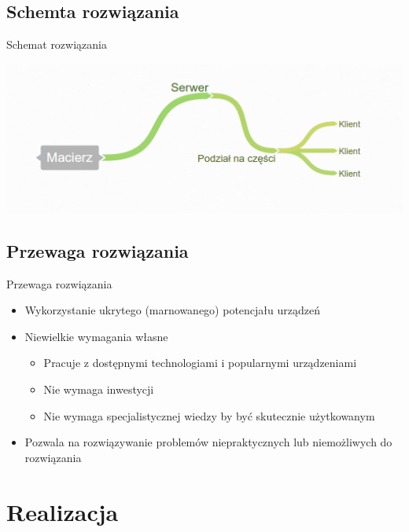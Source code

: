 \documentclass[12pt]{beamer}
\begin{document}
\subsection{Schemta rozwiązania}
\begin{frame}{Schemat rozwiązania}
\begin{center}
\includegraphics[scale=0.60]{schemta}\\ \vspace{25pt}
\end{center}
\end{frame}

\subsection{Przewaga rozwiązania}
\begin{frame}{Przewaga rozwiązania}
\begin{itemize}
\item Wykorzystanie ukrytego (marnowanego) potencjału urządzeń
\item Niewielkie wymagania własne 
\begin{itemize}
	\item Pracuje z dostępnymi technologiami i popularnymi urządzeniami
	\item Nie wymaga inwestycji
	\item Nie wymaga specjalistycznej wiedzy by być skutecznie użytkowanym
\end{itemize}
\item Pozwala na rozwiązywanie problemów niepraktycznych lub niemożliwych do rozwiązania
\end{itemize}
\end{frame}

\section{Realizacja}
\end{document}

